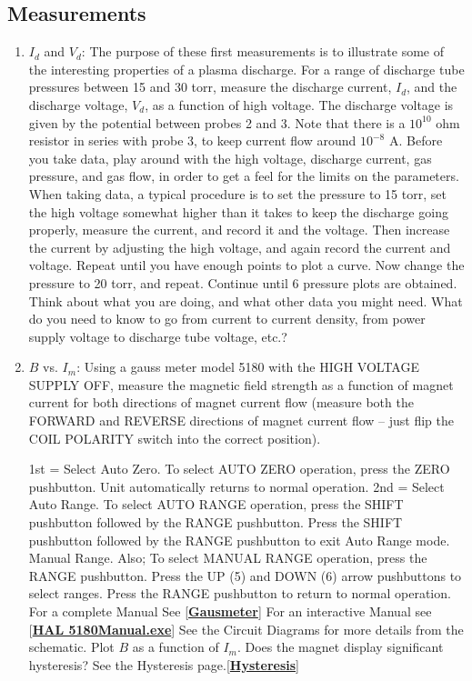 \documentclass{../lab}
\begin{document}
\subsection{Measurements}

\begin{enumerate}
    \item $I_d$ and $V_d$: The purpose of these first measurements is to illustrate some of the interesting properties of a plasma discharge. For a range of discharge tube pressures between 15 and 30 torr, measure the discharge current, $I_d$, and the discharge voltage, $V_d $, as a function of high voltage. The discharge voltage is given by the potential between probes 2 and 3. Note that there is a $10^{10}$ ohm resistor in series with probe 3, to keep current flow around $10^{-8}$ A. Before you take data, play around with the high voltage, discharge current, gas pressure, and gas flow, in order to get a feel for the limits on the parameters. When taking data, a typical procedure is to set the pressure to 15 torr, set the high voltage somewhat higher than it takes to keep the discharge going properly, measure the current, and record it and the voltage. Then increase the current by adjusting the high voltage, and again record the current and voltage. Repeat until you have enough points to plot a curve. Now change the pressure to 20 torr, and repeat. Continue until  6 pressure plots are obtained. Think about what you are doing, and what other data you might need. What do you need to know to go from current to current density, from power supply voltage to discharge tube voltage, etc.?

    \item $B$ vs. $I_m$: Using a gauss meter model 5180 with the HIGH VOLTAGE SUPPLY OFF, measure the magnetic field strength as a function of magnet current for both directions of magnet current flow (measure both the FORWARD and REVERSE directions of magnet current flow – just flip the COIL POLARITY switch into the correct position).

    1st = Select Auto Zero. To select AUTO ZERO operation, press the ZERO pushbutton. Unit automatically returns to normal operation. 2nd = Select Auto Range. To select AUTO RANGE operation, press the SHIFT pushbutton followed by the RANGE pushbutton. Press the SHIFT pushbutton followed by the RANGE pushbutton to exit Auto Range mode. Manual Range. Also; To select MANUAL RANGE operation, press the RANGE pushbutton. Press the UP (5) and DOWN (6) arrow pushbuttons to select ranges. Press the RANGE pushbutton to return to normal operation. For a complete Manual See [\href{http://physics111.lib.berkeley.edu/Physics111/Equipment\_Manuals/Gaussmeter5180.pdf}{\textbf{Gausmeter}}] For an interactive Manual see [\href{http://physics111.lib.berkeley.edu/Physics111/Reprints/HAL/5180Manual.exe}{\textbf{HAL 5180Manual.exe}}] See the Circuit Diagrams for more details from the schematic. Plot $B$ as a function of $I_m$. Does the magnet display significant hysteresis? See the Hysteresis page.[\href{http://experimentationlab.berkeley.edu/Hysteresis}{\textbf{Hysteresis}}]


\end{enumerate}
\end{document}

